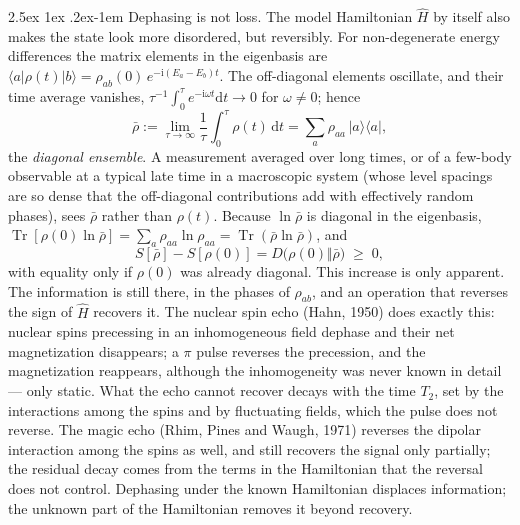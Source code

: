 \documentclass[10pt,a4paper]{article}
\makeatletter
\renewcommand{\paragraph}{\@startsection{paragraph}{4}{\z@}%
  {2.5ex \@plus 1ex \@minus .2ex}{-1em}%
  {\normalfont\fontsize{14pt}{17pt}\selectfont\bfseries}}
\newcommand{\dd}{\mathrm{d}}
\newcommand{\ii}{\mathrm{i}}
\newcommand{\Tr}{\operatorname{Tr}}
\makeatother
\begin{document}
\paragraph{Dephasing is not loss.}
The model Hamiltonian $ \hat H $ by itself also makes the state look more disordered, but reversibly.
For non-degenerate energy differences the matrix elements in the eigenbasis are $ \langle a|\rho(t)|b\rangle = \rho_{ab}(0)\,e^{-\ii (E_a - E_b)t} $.
The off-diagonal elements oscillate, and their time average vanishes, $ \tau^{-1}\int_0^\tau e^{-\ii \omega t}\dd t \to 0 $ for $ \omega \neq 0 $; hence
\[
  \bar\rho := \lim_{\tau\to\infty}\frac{1}{\tau}\int_0^\tau\rho(t)\,\dd t
  = \sum_a\rho_{aa}\,|a\rangle\langle a| ,
\]
the \emph{diagonal ensemble}.
A measurement averaged over long times, or of a few-body observable at a typical late time in a macroscopic system (whose level spacings are so dense that the off-diagonal contributions add with effectively random phases), sees $ \bar\rho $ rather than $ \rho(t) $.
Because $ \ln\bar\rho $ is diagonal in the eigenbasis, $ \Tr[\rho(0)\ln\bar\rho] = \sum_a\rho_{aa}\ln\rho_{aa} = \Tr(\bar\rho\ln\bar\rho) $, and
\[
  S[\bar\rho] - S[\rho(0)] = D\big(\rho(0) \Vert \bar\rho\big) \;\geq\; 0 ,
\]
with equality only if $ \rho(0) $ was already diagonal.
This increase is only apparent.
The information is still there, in the phases of $ \rho_{ab} $, and an operation that reverses the sign of $ \hat H $ recovers it.
The nuclear spin echo (Hahn, 1950) does exactly this: nuclear spins precessing in an inhomogeneous field dephase and their net magnetization disappears; a $ \pi $ pulse reverses the precession, and the magnetization reappears, although the inhomogeneity was never known in detail --- only static.
What the echo cannot recover decays with the time $ T_2 $, set by the interactions among the spins and by fluctuating fields, which the pulse does not reverse.
The magic echo (Rhim, Pines and Waugh, 1971) reverses the dipolar interaction among the spins as well, and still recovers the signal only partially; the residual decay comes from the terms in the Hamiltonian that the reversal does not control.
Dephasing under the known Hamiltonian displaces information; the unknown part of the Hamiltonian removes it beyond recovery.
\end{document}
